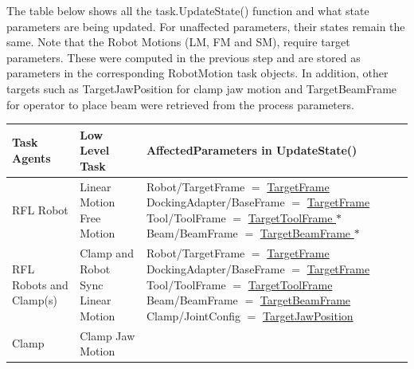 \documentclass[11pt]{book}
\begin{document}
The table below shows all the task.UpdateState() function and what state parameters are being updated. For unaffected parameters, their states remain the same. Note that the Robot Motions (LM, FM and SM), require target parameters. These were computed in the previous step and are stored as parameters in the corresponding RobotMotion task objects. In addition, other targets such as TargetJawPosition for clamp jaw motion and TargetBeamFrame for operator to place beam were retrieved from the process parameters.

\begin{table}[H]
\begin{adjustbox}{max width=\textwidth}
\begin{tabular}{p{2.38cm}p{5.42cm}p{8.21cm}}
\hline
\multicolumn{1}{|p{2.38cm}}{{\footnotesize \textbf{Task Agents}}} & 
\multicolumn{1}{|p{5.42cm}}{{\footnotesize \textbf{Low Level Task}}} & 
\multicolumn{1}{|p{8.21cm}|}{{\footnotesize \textbf{AffectedParameters in UpdateState()}}} \\ 
\hline
\multicolumn{1}{|p{2.38cm}}{{\footnotesize RFL Robot}} & 
\multicolumn{1}{|p{5.42cm}}{{\footnotesize Linear Motion} \newline
{\footnotesize Free Motion}} & 
\multicolumn{1}{|p{8.21cm}|}{{\footnotesize Robot/TargetFrame $=$ \uline{TargetFrame}} \newline
{\footnotesize DockingAdapter/BaseFrame $=$  \uline{TargetFrame}} \newline
{\footnotesize Tool/ToolFrame $=$ \uline{TargetToolFrame }$\ast$} \newline
{\footnotesize Beam/BeamFrame $=$ \uline{TargetBeamFrame }$\ast$}} \\ 
\hline
\multicolumn{1}{|p{2.38cm}}{{\footnotesize RFL Robots and Clamp(s)}} & 
\multicolumn{1}{|p{5.42cm}}{{\footnotesize Clamp and Robot Sync Linear Motion}} & 
\multicolumn{1}{|p{8.21cm}|}{{\footnotesize Robot/TargetFrame $=$ \uline{TargetFrame}} \newline
{\footnotesize DockingAdapter/BaseFrame $=$  \uline{TargetFrame}} \newline
{\footnotesize Tool/ToolFrame $=$ \uline{TargetToolFrame}} \newline
{\footnotesize Beam/BeamFrame $=$ \uline{TargetBeamFrame}} \newline
{\footnotesize Clamp/JointConfig $=$ \uline{TargetJawPosition}}} \\ 
\hline
\multicolumn{1}{|p{2.38cm}}{\multirow{3}{*}{\parbox{2.38cm}{{\footnotesize Clamp}}}} & 
\multicolumn{1}{|p{5.42cm}}{{\footnotesize Clamp Jaw Motion}} & 

\end{tabular}
\end{adjustbox}
\end{table}
\end{document}
